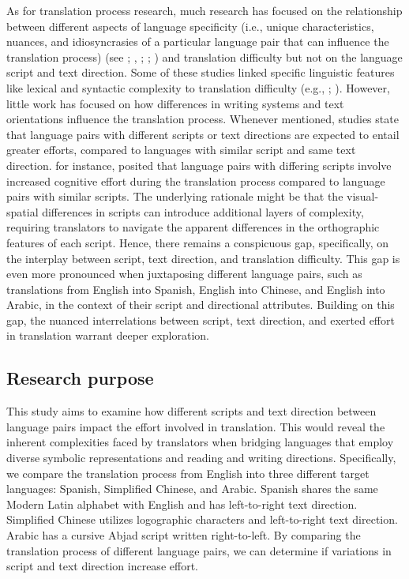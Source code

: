 \documentclass[output=paper]{langscibook}
\begin{document}
As for translation process research, much research has focused on the relationship between different aspects of language specificity (i.e., unique characteristics, nuances, and idiosyncrasies of a particular language pair that can influence the translation process) (see \citealt{Campbell1999}; \citealt{Gile2005}, \citealt{gile_2008}; \citealt{WangZou2018}; \citealt{ZouEtAl2022}) and translation difficulty but not on the language script and text direction. Some of these studies linked specific linguistic features like lexical and syntactic complexity to translation difficulty (e.g., \citealt{VanroyEtAl2021}; \citealt{ZouEtAl2021}). However, little work has focused on how differences in writing systems and text orientations influence the translation process. Whenever mentioned, studies state that language pairs with different scripts or text directions are expected to entail greater efforts, compared to languages with similar script and same text direction. \citet{LacruzEtAl2016} for instance, posited that language pairs with differing scripts involve increased cognitive effort during the translation process compared to language pairs with similar scripts. The underlying rationale might be that the visual-spatial differences in scripts can introduce additional layers of complexity, requiring translators to navigate the apparent differences in the orthographic features of each script. Hence, there remains a conspicuous gap, specifically, on the interplay between script, text direction, and translation difficulty. This gap is even more pronounced when juxtaposing different language pairs, such as translations from English into Spanish, English into Chinese, and English into Arabic, in the context of their script and directional attributes. Building on this gap, the nuanced interrelations between script, text direction, and exerted effort in translation warrant deeper exploration.

\subsection{Research purpose}

This study aims to examine how different scripts and text direction between language pairs impact the effort involved in translation. This would reveal the inherent complexities faced by translators when bridging languages that employ diverse symbolic representations and reading and writing directions. Specifically, we compare the translation process from English into three different target languages: Spanish, Simplified Chinese, and Arabic. Spanish shares the same Modern Latin alphabet with English and has left-to-right text direction. Simplified Chinese utilizes logographic characters and left-to-right text direction. Arabic has a cursive Abjad script written right-to-left. By comparing the translation process of different language pairs, we can determine if variations in script and text direction increase effort.
\end{document}
